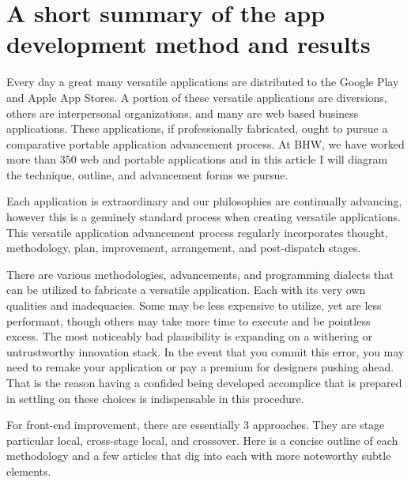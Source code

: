 \section{A short summary of the app development method and results}

Every day a great many versatile applications are distributed to the Google Play and Apple App Stores. A portion of these versatile applications are diversions, others are interpersonal organizations, and many are web based business applications. These applications, if professionally fabricated, ought to pursue a comparative portable application advancement process. At BHW, we have worked more than 350 web and portable applications and in this article I will diagram the technique, outline, and advancement forms we pursue. 

Each application is extraordinary and our philosophies are continually advancing, however this is a genuinely standard process when creating versatile applications. This versatile application advancement process regularly incorporates thought, methodology, plan, improvement, arrangement, and post-dispatch stages.

There are various methodologies, advancements, and programming dialects that can be utilized to fabricate a versatile application. Each with its very own qualities and inadequacies. Some may be less expensive to utilize, yet are less performant, though others may take more time to execute and be pointless excess. The most noticeably bad plausibility is expanding on a withering or untrustworthy innovation stack. In the event that you commit this error, you may need to remake your application or pay a premium for designers pushing ahead. That is the reason having a confided being developed accomplice that is prepared in settling on these choices is indispensable in this procedure.

For front-end improvement, there are essentially 3 approaches. They are stage particular local, cross-stage local, and crossover. Here is a concise outline of each methodology and a few articles that dig into each with more noteworthy subtle elements.


